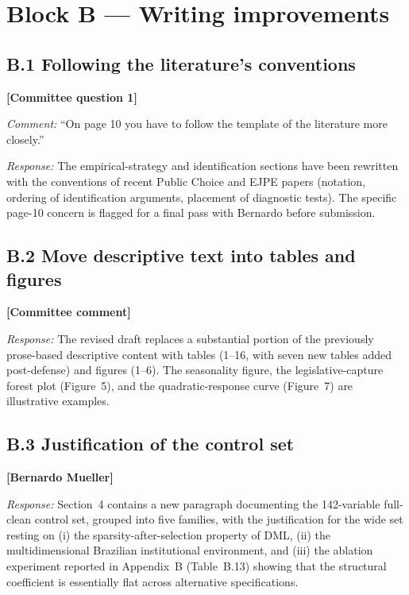 \documentclass[11pt]{article}
\newcommand{\committee}[1]{\textbf{[#1]}}
\begin{document}
\section{Block B — Writing improvements}

\subsection*{B.1 \quad Following the literature's conventions}
\committee{Committee question 1}

\noindent\emph{Comment:} ``On page 10 you have to follow the template of the
literature more closely.''

\noindent\emph{Response:} The empirical-strategy and identification sections
have been rewritten with the conventions of recent Public Choice and
EJPE papers (notation, ordering of identification arguments,
placement of diagnostic tests). The specific page-10 concern is
flagged for a final pass with Bernardo before submission.

\subsection*{B.2 \quad Move descriptive text into tables and figures}
\committee{Committee comment}

\noindent\emph{Response:} The revised draft replaces a substantial portion of
the previously prose-based descriptive content with tables (1--16,
with seven new tables added post-defense) and figures (1--6). The
seasonality figure, the legislative-capture forest plot
(Figure~5), and the quadratic-response curve (Figure~7) are
illustrative examples.

\subsection*{B.3 \quad Justification of the control set}
\committee{Bernardo Mueller}

\noindent\emph{Response:} Section~4 contains a new paragraph documenting the
142-variable full-clean control set, grouped into five families, with
the justification for the wide set resting on (i) the
sparsity-after-selection property of DML, (ii) the multidimensional
Brazilian institutional environment, and (iii) the ablation experiment
reported in Appendix~B (Table~B.13) showing that the structural
coefficient is essentially flat across alternative specifications.
\end{document}
